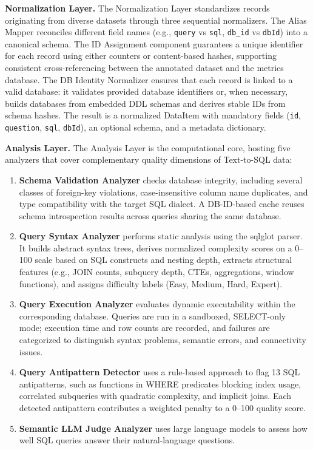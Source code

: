 \documentclass[]{einformatica}
\begin{document}
\textbf{Normalization Layer.} The Normalization Layer standardizes records originating from diverse datasets through three sequential normalizers. The Alias Mapper reconciles different field names (e.g., \texttt{query} vs \texttt{sql}, \texttt{db\_id} vs \texttt{dbId}) into a canonical schema. The ID Assignment component guarantees a unique identifier for each record using either counters or content-based hashes, supporting consistent cross-referencing between the annotated dataset and the metrics database. The DB Identity Normalizer ensures that each record is linked to a valid database: it validates provided database identifiers or, when necessary, builds databases from embedded DDL schemas and derives stable IDs from schema hashes. The result is a normalized DataItem with mandatory fields (\texttt{id}, \texttt{question}, \texttt{sql}, \texttt{dbId}), an optional schema, and a metadata dictionary.

\textbf{Analysis Layer.} The Analysis Layer is the computational core, hosting five analyzers that cover complementary quality dimensions of Text-to-SQL data:

\begin{enumerate}
\item \textbf{Schema Validation Analyzer} checks database integrity, including several classes of foreign-key violations, case-insensitive column name duplicates, and type compatibility with the target SQL dialect. A DB-ID-based cache reuses schema introspection results across queries sharing the same database.

\item \textbf{Query Syntax Analyzer} performs static analysis using the sqlglot parser. It builds abstract syntax trees, derives normalized complexity scores on a 0--100 scale based on SQL constructs and nesting depth, extracts structural features (e.g., JOIN counts, subquery depth, CTEs, aggregations, window functions), and assigns difficulty labels (Easy, Medium, Hard, Expert).

\item \textbf{Query Execution Analyzer} evaluates dynamic executability within the corresponding database. Queries are run in a sandboxed, SELECT-only mode; execution time and row counts are recorded, and failures are categorized to distinguish syntax problems, semantic errors, and connectivity issues.

\item \textbf{Query Antipattern Detector} uses a rule-based approach to flag 13 SQL antipatterns, such as functions in WHERE predicates blocking index usage, correlated subqueries with quadratic complexity, and implicit joins. Each detected antipattern contributes a weighted penalty to a 0--100 quality score.

\item \textbf{Semantic LLM Judge Analyzer} uses large language models to assess how well SQL queries answer their natural-language questions. 
\end{enumerate}
\end{document}
